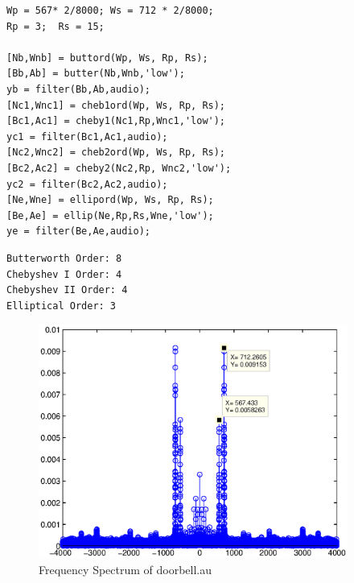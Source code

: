 \documentclass{article}
\begin{document}
\begin{lstlisting}
Wp = 567* 2/8000; Ws = 712 * 2/8000;
Rp = 3;  Rs = 15;

[Nb,Wnb] = buttord(Wp, Ws, Rp, Rs);
[Bb,Ab] = butter(Nb,Wnb,'low');
yb = filter(Bb,Ab,audio);
[Nc1,Wnc1] = cheb1ord(Wp, Ws, Rp, Rs);
[Bc1,Ac1] = cheby1(Nc1,Rp,Wnc1,'low');
yc1 = filter(Bc1,Ac1,audio);
[Nc2,Wnc2] = cheb2ord(Wp, Ws, Rp, Rs);
[Bc2,Ac2] = cheby2(Nc2,Rp, Wnc2,'low');
yc2 = filter(Bc2,Ac2,audio);
[Ne,Wne] = ellipord(Wp, Ws, Rp, Rs);
[Be,Ae] = ellip(Ne,Rp,Rs,Wne,'low');
ye = filter(Be,Ae,audio);
\end{lstlisting}

\begin{verbatim}
Butterworth Order: 8
Chebyshev I Order: 4
Chebyshev II Order: 4
Elliptical Order: 3
\end{verbatim}

\begin{figure}[htbp]
\centering
\includegraphics[width=4in]{project6_part3.eps}
\caption{Frequency Spectrum of doorbell.au}
\label{fig:figure13}
\end{figure}
\end{document}
